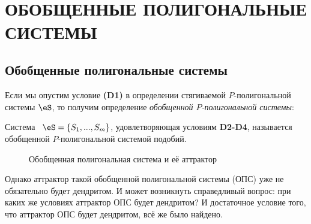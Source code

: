 \hspace{1cm}\\
\hspace{1cm}\\
\hspace{1cm}\\
\hspace{1cm}\\



\newpage
\section[Обобщенные полигональные системы]{ОБОБЩЕННЫЕ ПОЛИГОНАЛЬНЫЕ СИСТЕМЫ}

\subsection{Обобщенные полигональные системы}


Если мы опустим условие {\bf(D1)} в определении стягиваемой $P$-полигональной системы $\eS$, то получим определение {\em обобщенной $P$-полигональной системы}:
\begin{definition}\label{gps}
Система \ $\eS=\{S_1,...,S_m\} $, удовлетворяющая условиям {\bf D2-D4}, называется обобщенной $P$-полигональной системой подобий.
\end{definition}
\begin{figure}[h]
\centering
\caption{Обобщенная полигональная система и её аттрактор}%
\label{gps1}%
\end{figure}

Однако аттрактор такой обобщенной полигональной системы (ОПС) уже не обязательно будет дендритом. И может возникнуть справедливый вопрос: при каких же условиях аттрактор ОПС будет дендритом? И достаточное условие того, что аттрактор ОПС будет дендритом, всё же было найдено.

